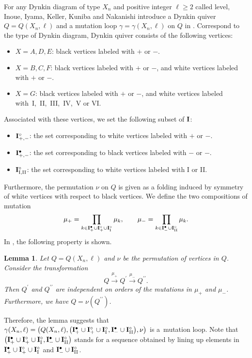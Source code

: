 \documentclass[pdftex]{sigma}
\numberwithin{equation}{section}
\newtheorem{Lemma}[Theorem]{Lemma}
\begin{document}
For any Dynkin diagram of type $X_n$ and positive integer $\ell\geq2$ called level, Inoue, Iyama, Keller, Kuniba and Nakanishi introduce a Dynkin quiver $Q=Q(X_n,\ell)$ and a mutation loop $\gamma=\gamma(X_n,\ell)$ on $Q$ in \cite{IIKKN, IIKKN2}.
Correspond to the type of Dynkin diagram, Dynkin quiver consists of the following vertices:
	\begin{itemize}\itemsep=0pt
	\item $X=A,D,E$: black vertices labeled with $+$ or $-$.
	\item $X=B,C,F$: black vertices labeled with $+$ or $-$, and white vertices labeled with $+$ or $-$.
	\item $X=G$: black vertices labeled with $+$ or $-$, and white vertices labeled with~I,~II,~III,~IV,~V or VI.
	\end{itemize}
Associated with these vertices, we set the following subset of ${\bf I}$:
	\begin{itemize}\itemsep=0pt
	\item ${\bf I}_{+,-}^\circ$: the set corresponding to white vertices labeled with $+$ or $-$.
	\item ${\bf I}_{+,-}^\bullet$: the set corresponding to black vertices labeled with $-$ or $-$.
	\item ${\bf I}_{\rm I,II}^\circ$: the set corresponding to white vertices labeled with I or II.
	\end{itemize}
Furthermore, the permutation $\nu$ on $Q$ is given as a folding induced by symmetry of white vertices with respect to black vertices.
We define the two compositions of mutation
		\[\mu_+=\prod_{k\in{\bf I}_+^{\bullet}\cup{\bf I}_+^{\circ}\cup{\bf I}_{\rm I}^\circ}\mu_k,\qquad \mu_-=\prod_{k\in{\bf I}_-^{\bullet}\cup{\bf I}_{\rm II}^\circ}\mu_k.\]
In \cite{IIKKN,IIKKN2}, the following property is shown.
		\begin{Lemma}
		Let $Q=Q(X_n,\ell)$ and $\nu$ be the permutation of vertices in $Q$.
		Consider the transformation
			\[Q\overset{\mu_+}{\longrightarrow}Q^\prime\overset{\mu_-}{\longrightarrow}Q^{\prime\prime}.\]
		Then $Q^\prime$ and $Q^{\prime\prime}$ are independent on orders of the mutations in $\mu_+$ and $\mu_-$.
		Furthermore, we have $Q=\nu(Q^{\prime\prime})$.
		\end{Lemma}
Therefore, the lemma suggests that $\gamma(X_n,\ell)=\bigl(Q(X_n,\ell),\bigl({\bf I}_+^{\bullet}\cup{\bf I}_+^{\circ}\cup{\bf I}_{\rm I}^\circ,{\bf I}_-^{\bullet}\cup{\bf I}_{\rm II}^\circ\bigr),\nu\bigr)$ is a~mutation loop.
Note that $\bigl({\bf I}_+^{\bullet}\cup{\bf I}_+^{\circ}\cup{\bf I}_{\rm I}^\circ,{\bf I}_-^{\bullet}\cup{\bf I}_{\rm II}^\circ\bigr)$ stands for a sequence obtained by lining up elements in ${\bf I}_+^\bullet\cup{\bf I}_+^\circ\cup{\bf I}_{\rm I}^\circ$ and ${\bf I}_-^\bullet\cup{\bf I}_{\rm II}^\circ$.
\end{document}
